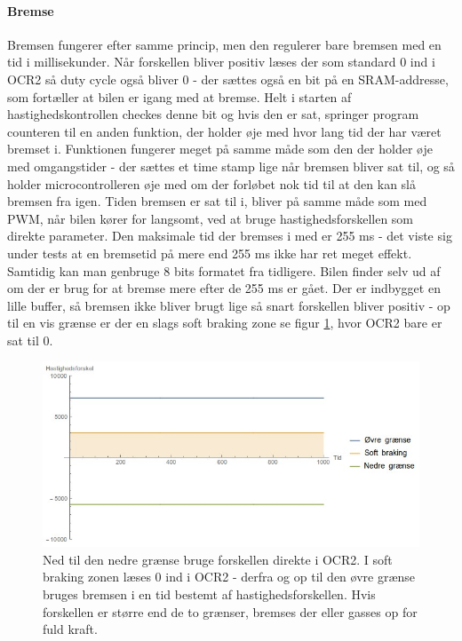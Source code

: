 \paragraph{Bremse}
Bremsen fungerer efter samme princip, men den regulerer bare bremsen med en tid i millisekunder. Når forskellen bliver positiv læses der som standard 0 ind i OCR2 så duty cycle også bliver 0 - der sættes også en bit på en SRAM-addresse, som fortæller at bilen er igang med at bremse. Helt i starten af hastighedskontrollen checkes denne bit og hvis den er sat, springer program counteren til en anden funktion, der holder øje med hvor lang tid der har været bremset i. Funktionen fungerer meget på samme måde som den der holder øje med omgangstider - der sættes et time stamp lige når bremsen bliver sat til, og så holder microcontrolleren øje med om der forløbet nok tid til at den kan slå bremsen fra igen. Tiden bremsen er sat til i, bliver på samme måde som med PWM, når bilen kører for langsomt, ved at bruge hastighedsforskellen som direkte parameter. Den maksimale tid der bremses i med er 255 ms - det viste sig under tests at en bremsetid på mere end 255 ms ikke har ret meget effekt. Samtidig kan man genbruge 8 bits formatet fra tidligere. Bilen finder selv ud af om der er brug for at bremse mere efter de 255 ms er gået. Der er indbygget en lille buffer, så bremsen ikke bliver brugt lige så snart forskellen bliver positiv - op til en vis grænse er der en slags soft braking zone se figur \ref{fig:Forgiveness}, hvor OCR2 bare er sat til 0. 

\begin{figure}[h]

	\centering
		\includegraphics[scale=0.4]{Billeder/Braking.jpg}
	\caption{Ned til den nedre grænse bruge forskellen direkte i OCR2. I soft braking zonen læses 0 ind i OCR2 - derfra og op til den øvre grænse bruges bremsen i en tid bestemt af hastighedsforskellen. Hvis forskellen er større end de to grænser, bremses der eller gasses op for fuld kraft.}
	\label{fig:Forgiveness}
	
\end{figure}

